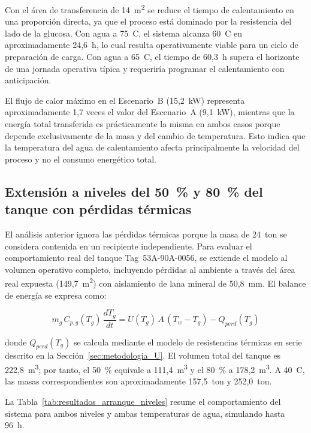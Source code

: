 Con el área de transferencia de 14~m\textsuperscript{2} se reduce el tiempo de calentamiento en una proporción directa, ya que el proceso está dominado por la resistencia del lado de la glucosa. Con agua a 75~\textdegree C, el sistema alcanza 60~\textdegree C en aproximadamente 24,6~h, lo cual resulta operativamente viable para un ciclo de preparación de carga. Con agua a 65~\textdegree C, el tiempo de 60,3~h supera el horizonte de una jornada operativa típica y requeriría programar el calentamiento con anticipación.

El flujo de calor máximo en el Escenario~B (15,2~kW) representa aproximadamente 1,7 veces el valor del Escenario~A (9,1~kW), mientras que la energía total transferida es prácticamente la misma en ambos casos porque depende exclusivamente de la masa y del cambio de temperatura. Esto indica que la temperatura del agua de calentamiento afecta principalmente la velocidad del proceso y no el consumo energético total.

\subsection{Extensión a niveles del 50~\% y 80~\% del tanque con pérdidas térmicas}

El análisis anterior ignora las pérdidas térmicas porque la masa de 24~ton se considera contenida en un recipiente independiente. Para evaluar el comportamiento real del tanque Tag~53A-90A-0056, se extiende el modelo al volumen operativo completo, incluyendo pérdidas al ambiente a través del área real expuesta (149,7~m\textsuperscript{2}) con aislamiento de lana mineral de 50,8~mm. El balance de energía se expresa como:

\begin{equation}
m_g \, C_{p,g}(T_g) \, \frac{dT_g}{dt} = U(T_g) \, A \, (T_w - T_g) - Q_{perd}(T_g)
\label{eq:balance_arranque_perdidas}
\end{equation}

donde $Q_{perd}(T_g)$ se calcula mediante el modelo de resistencias térmicas en serie descrito en la Sección~\ref{sec:metodologia_U}. El volumen total del tanque es 222,8~m\textsuperscript{3}; por tanto, el 50~\% equivale a 111,4~m\textsuperscript{3} y el 80~\% a 178,2~m\textsuperscript{3}. A 40~\textdegree C, las masas correspondientes son aproximadamente 157,5~ton y 252,0~ton.

La Tabla~\ref{tab:resultados_arranque_niveles} resume el comportamiento del sistema para ambos niveles y ambas temperaturas de agua, simulando hasta 96~h.

